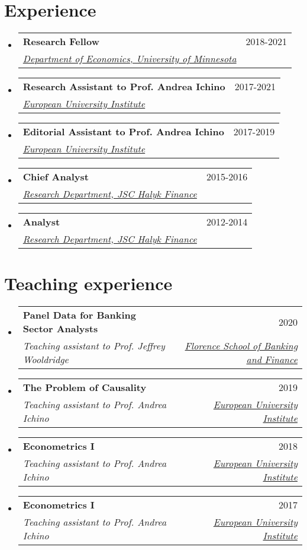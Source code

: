 \documentclass[a4, 11pt]{article}
\makeatletter
\newcommand{\resumeSubheading}[4]{
      \vspace{-2pt}\item
        \begin{tabular*}{0.97\textwidth}[t]{l@{\extracolsep{\fill}}r}
          \textbf{#1} & #2 \\
          \textit{\small#3} & \textit{\small #4} \\
        \end{tabular*}
    }
\newcommand{\resumeSubHeadingListStart}{\begin{itemize}[leftmargin=0.15in, label={}]}
\newcommand{\resumeSubHeadingListEnd}{\end{itemize}}
\makeatother
\begin{document}
    \section{Experience}
  \resumeSubHeadingListStart
        \resumeSubheading
          {Research Fellow}
          {2018-2021}
          {\href{https://cla.umn.edu/economics}{Department of Economics, University of Minnesota} }
          {}
        \resumeSubheading
          {Research Assistant to Prof. Andrea Ichino}
          {2017-2021}
          {\href{https://www.eui.eu}{European University Institute} }
          {}
        \resumeSubheading
          {Editorial Assistant to Prof. Andrea Ichino}
          {2017-2019}
          {\href{https://www.eui.eu}{European University Institute} }
          {}
        \resumeSubheading
          {Chief Analyst}
          {2015-2016}
          {\href{https://www.halykfinance.kz}{Research Department, JSC Halyk Finance} }
          {}
        \resumeSubheading
          {Analyst}
          {2012-2014}
          {\href{https://www.halykfinance.kz}{Research Department, JSC Halyk Finance} }
          {}
    \resumeSubHeadingListEnd


    \section{Teaching experience}
  \resumeSubHeadingListStart
        \resumeSubheading
          {Panel Data for Banking Sector Analysts}
          {2020}
          {Teaching assistant to Prof. Jeffrey Wooldridge}
          { \href{https://www.fbf.eui.eu}{Florence School of Banking and Finance} }
        \resumeSubheading
          {The Problem of Causality}
          {2019}
          {Teaching assistant to Prof. Andrea Ichino}
          { \href{https://www.eui.eu}{European University Institute} }
        \resumeSubheading
          {Econometrics I}
          {2018}
          {Teaching assistant to Prof. Andrea Ichino}
          { \href{https://www.eui.eu}{European University Institute} }
        \resumeSubheading
          {Econometrics I}
          {2017}
          {Teaching assistant to Prof. Andrea Ichino}
          { \href{https://www.eui.eu}{European University Institute} }
    \resumeSubHeadingListEnd


\end{document}
